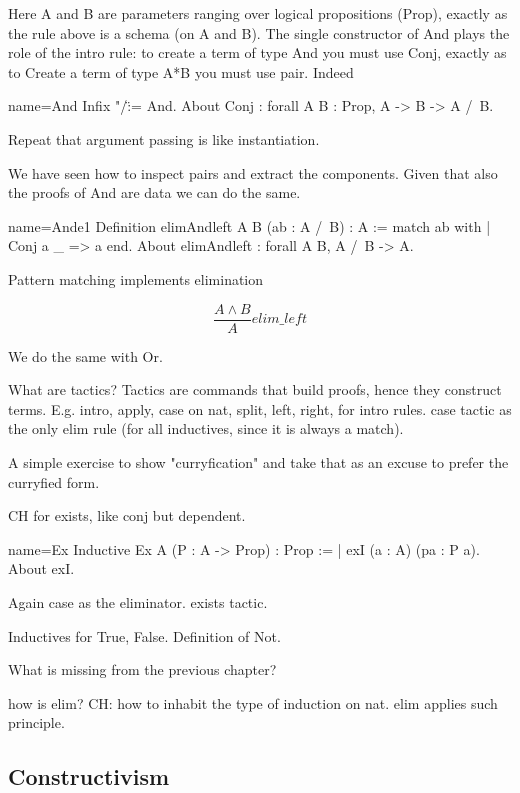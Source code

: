 Here A and B are parameters ranging over logical propositions (Prop),
exactly as the rule above is a schema (on A and B). The single constructor
of And plays the role of the intro rule: to create a term of type And
you must use Conj, exactly as to Create a term of type A*B you must use
pair.  Indeed

\begin{coq}{name=And}{}
Infix "/\" := And.
About Conj : forall A B : Prop, A -> B -> A /\ B.
\end{coq}

Repeat that argument passing is like instantiation.

We have seen how to inspect pairs and extract the components. Given that
also the proofs of And are data we can do the same.

\begin{coq}{name=Ande1}{}
Definition elimAndleft A B (ab : A /\ B) : A :=
match ab with
| Conj a _ => a
end.
About elimAndleft : forall A B, A /\ B -> A.
\end{coq}

Pattern matching implements elimination

$$
\frac{A \wedge B}{A}elim\_left
$$

We do the same with Or.

What are tactics?  Tactics are commands that build proofs, hence
they construct terms.  E.g. intro, apply, case on nat, split, left, right, for
intro rules.  case tactic as the only elim rule (for all inductives, since it
is always a match).

A simple exercise to show "curryfication" and take that as an excuse
to prefer the curryfied form.

CH for exists, like conj but dependent.

\begin{coq}{name=Ex}{}
Inductive Ex A (P : A -> Prop) : Prop :=
| exI (a : A) (pa : P a).
About exI.
\end{coq}

Again case as the eliminator.  exists tactic.

Inductives for True, False. Definition of Not.

What is missing from the previous chapter?

how is elim?
CH: how to inhabit the type of induction on nat.
elim applies such principle.

\subsection{Constructivism}

